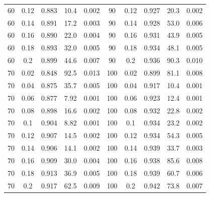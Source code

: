 \documentclass[12pt]{article}
\begin{document}
\begin{spacing}{2.0}
\begin{table}[hb!]
\begin{tabular}{c c | c | c c ||c c | c | c c |}
                60&0.12&0.883&10.4&0.002	&	90&0.12&0.927&20.3&0.002\\
                60&0.14&0.891&17.2&0.003	&	90&0.14&0.928&53.0&0.006\\
                60&0.16&0.890&22.0&0.004	&	90&0.16&0.931&43.9&0.005\\
                60&0.18&0.893&32.0&0.005	&	90&0.18&0.934&48.1&0.005\\
                60&0.2&0.899&44.6&0.007	&	90&0.2&0.936&90.3&0.010\\
                70&0.02&0.848&92.5&0.013	&	100&0.02&0.899&81.1&0.008\\
                70&0.04&0.875&35.7&0.005	&	100&0.04&0.917&10.4&0.001\\
                70&0.06&0.877&7.92&0.001	&	100&0.06&0.923&12.4&0.001\\
                70&0.08&0.898&16.6&0.002	&	100&0.08&0.932&22.8&0.002\\
                70&0.1&0.904&8.82&0.001	&	100&0.1&0.934&23.2&0.002\\
                70&0.12&0.907&14.5&0.002	&	100&0.12&0.934&54.3&0.005\\
                70&0.14&0.906&14.1&0.002	&	100&0.14&0.939&33.7&0.003\\
                70&0.16&0.909&30.0&0.004	&	100&0.16&0.938&85.6&0.008\\
                70&0.18&0.913&36.9&0.005	&	100&0.18&0.939&60.7&0.006\\
                70&0.2&0.917&62.5&0.009	&	100&0.2&0.942&73.8&0.007\\
				\hline
			\end{tabular}
			\end{table}


\end{spacing}
\end{document}
